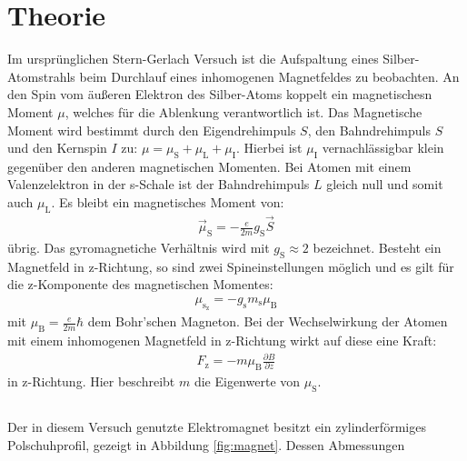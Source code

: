 \section{Theorie}
\label{sec:Theorie}
Im ursprünglichen Stern-Gerlach Versuch ist die Aufspaltung eines Silber-Atomstrahls beim
Durchlauf eines inhomogenen Magnetfeldes zu beobachten.
An den Spin vom äußeren Elektron des Silber-Atoms koppelt ein magnetischesn
Moment $\mu$, welches für die Ablenkung verantwortlich ist.
Das Magnetische Moment wird bestimmt durch den Eigendrehimpuls $S$,
den Bahndrehimpuls $S$ und den Kernspin $I$ zu: $\mu=\mu_\mathrm{S}+\mu_\mathrm{L}+\mu_\mathrm{I}$.
Hierbei ist $\mu_\mathrm{I}$ vernachlässigbar klein gegenüber den anderen
magnetischen Momenten.
Bei Atomen mit einem Valenzelektron in der s-Schale ist der Bahndrehimpuls
$L$ gleich null und somit auch $\mu_\mathrm{L}$.
Es bleibt ein magnetisches Moment von:
\begin{align}
  \vec{\mu}_\mathrm{S}=-\frac{e}{2m}g_\mathrm{S}\vec{S}
\end{align}
übrig. Das gyromagnetiche Verhältnis wird mit $g_\mathrm{S}\approx 2$ bezeichnet.
Besteht ein Magnetfeld in z-Richtung, so sind zwei Spineinstellungen möglich und
es gilt für die z-Komponente des magnetischen Momentes:
\begin{align}
  \mu_\mathrm{s_\mathrm{z}}=-g_\mathrm{s}m_\mathrm{s}\mu_\mathrm{B}
\end{align}
mit $\mu_\mathrm{B}=\frac{e}{2m}\hbar$ dem Bohr'schen Magneton.
Bei der Wechselwirkung der Atomen mit einem inhomogenen Magnetfeld
in z-Richtung wirkt auf diese eine Kraft:
\begin{align}
  F_\mathrm{z}=-m\mu_\mathrm{B}\frac{\partial B}{\partial z}
\end{align}
in z-Richtung. Hier beschreibt $m$ die Eigenwerte von $\mu_\mathrm{S}$.

\subsection{}
Der in diesem Versuch genutzte Elektromagnet besitzt ein zylinderförmiges
Polschuhprofil, gezeigt in Abbildung \ref{fig:magnet}.
Dessen Abmessungen

